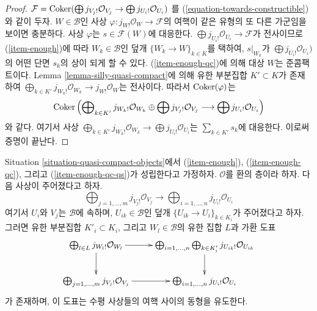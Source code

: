 \begin{proof}
$\mathcal{F} = \mathop{\mathrm{Coker}}(\bigoplus j_{V_j!}\mathcal{O}_{V_j} \to
\bigoplus j_{U_i!}\mathcal{O}_{U_i})$
를 (\ref{equation-towards-constructible})와 같이 두자. $W \in \mathcal{B}$인
사상 $\varphi : j_{W!}\mathcal{O}_W \to \mathcal{F}$의 여핵이 같은 유형의
또 다른 가군임을 보이면 충분하다. 사상 $\varphi$는
$s \in \mathcal{F}(W)$에 대응한다.
$\bigoplus j_{U_i!}\mathcal{O}_{U_i} \to \mathcal{F}$가 전사이므로
(\ref{item-enough})에 따라 $W_k \in \mathcal{B}$인 덮개
$\{W_k \to W\}_{k \in K}$를 택하여, $s|_{W_k}$가
$\bigoplus j_{U_i!}\mathcal{O}_{U_i})$의 어떤 단면 $s_k$의 상이 되게 할 수
있다. (\ref{item-enough-qc})에 의해 대상 $W$는 준콤팩트이다. Lemma
\ref{lemma-silly-quasi-compact}에 의해 유한 부분집합 $K' \subset K$가
존재하여
$\bigoplus_{k \in K'} j_{W_k!}\mathcal{O}_{W_k} \to j_{W!}\mathcal{O}_W$는
전사이다. 따라서 $\mathop{\mathrm{Coker}}(\varphi)$는
$$
\mathop{\mathrm{Coker}}\left(
\bigoplus\nolimits_{k \in K'} j_{W_k!}\mathcal{O}_{W_k} \oplus
\bigoplus j_{V_j!}\mathcal{O}_{V_j}
\longrightarrow
\bigoplus j_{U_i!}\mathcal{O}_{U_i}
\right)
$$
와 같다. 여기서 사상 $\bigoplus_{k \in K'} j_{W_k!}\mathcal{O}_{W_k}
\to \bigoplus j_{U_i!}\mathcal{O}_{U_i}$는
$\sum_{k \in K'} s_k$에 대응한다. 이로써 증명이 끝난다.
\end{proof}

\begin{lemma}
\label{lemma-change-presentation-towards-constructibles}
Situation \ref{situation-quasi-compact-objects}에서
(\ref{item-enough}), (\ref{item-enough-qc}), 그리고
(\ref{item-enough-qc-qs})가 성립한다고 가정하자. $\mathcal{O}$를 환의 층이라
하자. 다음 사상이 주어졌다고 하자.
$$
\bigoplus\nolimits_{j = 1, \ldots, m} j_{V_j!}\mathcal{O}_{V_j}
\longrightarrow
\bigoplus\nolimits_{i = 1, \ldots, n} j_{U_i!}\mathcal{O}_{U_i}
$$
여기서 $U_i$와 $V_j$는 $\mathcal{B}$에 속하며,
$U_{ik} \in \mathcal{B}$인 덮개 $\{U_{ik} \to U_i\}_{k \in K_i}$가
주어졌다고 하자. 그러면 유한 부분집합 $K'_i \subset K_i$, 그리고
$W_l \in \mathcal{B}$의 유한 집합 $L$과 가환 도표
$$
\xymatrix{
\bigoplus_{l \in L} j_{W_l!}\mathcal{O}_{W_l} \ar[d] \ar[r] &
\bigoplus_{i = 1, \ldots, n} \bigoplus_{k \in K'_i}
j_{U_{ik}!}\mathcal{O}_{U_{ik}} \ar[d] \\
\bigoplus_{j = 1, \ldots, m} j_{V_j!}\mathcal{O}_{V_j} \ar[r] &
\bigoplus_{i = 1, \ldots, n} j_{U_i!}\mathcal{O}_{U_i}
}
$$
가 존재하며, 이 도표는 수평 사상들의 여핵 사이의 동형을 유도한다.
\end{lemma}

